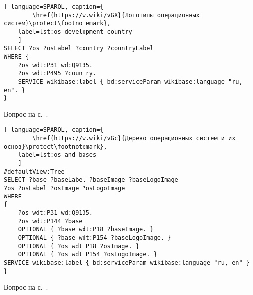\begin{task}
\label{answer:os_country}

\begin{lstlisting}[ language=SPARQL, caption={
		\href{https://w.wiki/vGX}{Логотипы операционных систем}\protect\footnotemark},
	label=lst:os_development_country
	]
SELECT ?os ?osLabel ?country ?countryLabel
WHERE {
	?os wdt:P31 wd:Q9135.
	?os wdt:P495 ?country.
	SERVICE wikibase:label { bd:serviceParam wikibase:language "ru, en". }
}
\end{lstlisting}

\small{Вопрос на с.~\pageref{tasks:operating_system_tasks}.}
\end{task}

\begin{task}
\label{answer:os_and_bases}

\begin{lstlisting}[ language=SPARQL, caption={
		\href{https://w.wiki/vGc}{Дерево операционных систем и их основ}\protect\footnotemark},
	label=lst:os_and_bases
	]
#defaultView:Tree
SELECT ?base ?baseLabel ?baseImage ?baseLogoImage
?os ?osLabel ?osImage ?osLogoImage
WHERE
{
	?os wdt:P31 wd:Q9135.
	?os wdt:P144 ?base.
	OPTIONAL { ?base wdt:P18 ?baseImage. }
	OPTIONAL { ?base wdt:P154 ?baseLogoImage. }
	OPTIONAL { ?os wdt:P18 ?osImage. }
	OPTIONAL { ?os wdt:P154 ?osLogoImage. }
SERVICE wikibase:label { bd:serviceParam wikibase:language "ru, en" }
}
\end{lstlisting}

\small{Вопрос на с.~\pageref{tasks:operating_system_tasks}.}
\end{task}


